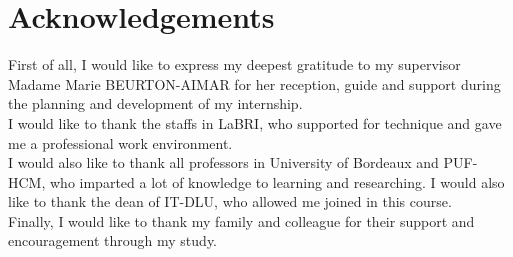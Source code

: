 \chapter*{Acknowledgements}
\thispagestyle{empty}
\indent First of all, I would like to express my deepest gratitude to my supervisor Madame Marie BEURTON-AIMAR for her reception, guide and support during the planning and development of my internship.
\\[0.3cm]
I would like to thank the staffs in LaBRI, who supported for technique and gave me a professional work environment. 
\\[0.3cm]
I would also like to thank all professors in University of Bordeaux and PUF-HCM, who imparted a lot of knowledge to learning and researching. I would also like to thank the dean of IT-DLU, who allowed me joined in this course.
\\[0.3cm]
Finally, I would like to thank my family and colleague for their support and encouragement through my study.
\clearpage